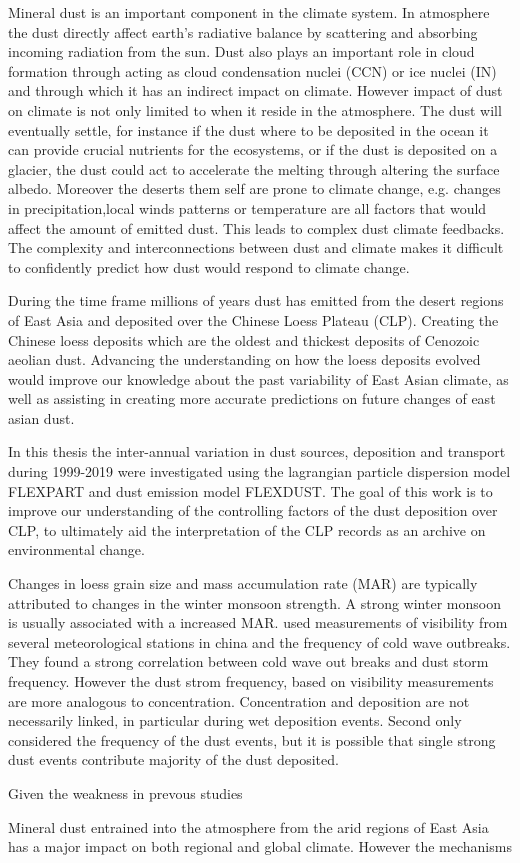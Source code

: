  
 Mineral dust is an important component in the climate system. In atmosphere the dust directly affect earth's radiative balance by scattering and absorbing incoming radiation from the sun. Dust also plays an important role in cloud formation through acting as cloud condensation nuclei (CCN) or ice nuclei (IN) and through which it has an indirect impact on climate. However impact of dust on climate is not only limited to when it reside in the atmosphere. The dust will eventually settle, for instance if the dust where to be deposited in the ocean it can provide crucial nutrients for the ecosystems, or if the dust is deposited on a glacier, the dust could act to accelerate the melting through altering the surface albedo. Moreover the deserts them self are prone to climate change, e.g. changes in precipitation,local winds patterns or temperature are all factors that would affect the amount of emitted dust. This leads to complex dust climate feedbacks. The complexity and interconnections between dust and climate makes it difficult to confidently predict how dust would respond to climate change. 
 
 During the time frame millions of years dust has emitted from the desert regions of East Asia and deposited over the Chinese Loess Plateau (CLP). Creating the Chinese loess deposits which are the oldest and thickest deposits of Cenozoic aeolian dust. Advancing the understanding on how the loess deposits evolved would improve our knowledge about the past variability of East Asian climate, as well as assisting in creating more accurate predictions on future changes of east asian dust. 
 
In this thesis the inter-annual variation in dust sources, deposition and transport during 1999-2019 were investigated using the lagrangian particle dispersion model FLEXPART \parencite{Flexpart10.4_ref} and dust emission model FLEXDUST. The goal of this work is to improve our understanding of the controlling factors of the dust deposition over CLP, to ultimately aid the interpretation of the CLP records as an archive on environmental change.
 
Changes in loess grain size and mass accumulation rate (MAR) are typically attributed to changes in the winter monsoon strength. A strong winter monsoon is usually associated with a increased MAR. \textcite{wyrwoll2016cold} used measurements of visibility from several meteorological stations in china and the frequency of cold wave outbreaks. They found a strong correlation between cold wave out breaks and dust storm frequency. However the dust strom frequency, based on visibility measurements are more analogous to concentration. Concentration and deposition are not necessarily linked, in particular during wet deposition events. Second \textcite{wyrwoll2016cold} only considered the frequency of the dust events, but it is possible that single strong dust events contribute majority of the dust deposited. 

Given the weakness in prevous studies 
\par Mineral dust entrained into the atmosphere from the arid regions of East Asia has a major impact on both regional and global climate. However the mechanisms 